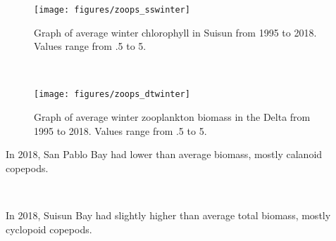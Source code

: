 \documentclass[
]{book}
\begin{document}
\begin{panel-grid}
\begin{columns-nocenter}
\begin{column800}

\begin{expand}

\begin{figure}
\texttt{[image: figures/zoops\_sswinter]} \caption{Graph of average winter chlorophyll in Suisun from 1995 to 2018. Values range from .5 to 5.}\label{fig:unnamed-chunk-166}
\end{figure}

\end{expand}

\end{column800}

\begin{column40}

~

\end{column40}

\begin{column800}

\begin{expand}

\begin{figure}
\texttt{[image: figures/zoops\_dtwinter]} \caption{Graph of average winter zooplankton biomass in the Delta from 1995 to 2018. Values range from .5 to 5.}\label{fig:unnamed-chunk-167}
\end{figure}

\end{expand}

\end{column800}

\end{columns-nocenter}

\begin{columns-nocenter}

\begin{column800}

In 2018, San Pablo Bay had lower than average biomass, mostly calanoid copepods.

\end{column800}

\begin{column40}

~

\end{column40}

\begin{column800}

In 2018, Suisun Bay had slightly higher than average total biomass, mostly cyclopoid copepods.


\end{column800}
\end{columns-nocenter}
\end{panel-grid}
\end{document}
